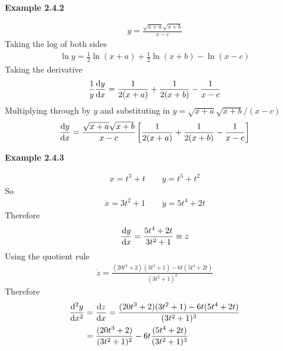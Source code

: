 \vspace{10mm}
\textbf{Example 2.4.2}

\begin{align*}
    y = \frac{\sqrt{x+a}\sqrt{x+b}}{x-c}
\end{align*}
Taking the log of both sides
\begin{align*}
    \ln y = \frac{1}{2} \ln(x+a) + \frac{1}{2} \ln(x+b) -  \ln(x-c)
\end{align*}
Taking the derivative
\begin{align*}
    \frac{1}{y}\frac{{\rm d}y}{{\rm d}x} = \frac{1}{2(x+a)} +\frac{1}{2(x+b)} -  \frac{1}{x-c}
\end{align*}
Multiplying through by $y$ and substituting in $y = \sqrt{x+a}\sqrt{x+b}/(x-c)$
\begin{align*}
    \frac{{\rm d}y}{{\rm d}x} = \frac{\sqrt{x+a}\sqrt{x+b}}{x-c}\left[\frac{1}{2(x+a)} +\frac{1}{2(x+b)} -  \frac{1}{x-c}\right]
\end{align*}

\vspace{10mm}
\textbf{Example 2.4.3}

\begin{align*}
x=t^3+t \qquad y=t^5+t^2
\end{align*}
So
\begin{align*}
\dot{x}=3t^2+1 \qquad \dot{y}=5t^4+2t
\end{align*}
Therefore
\begin{align*}
\frac{{\rm d}y}{{\rm d}x} = \frac{5t^4+2t}{3t^2+1} \equiv z
\end{align*}
Using the quotient rule
\begin{align*}
\dot{z} = \frac{(20t^3+2)(3t^2+1)-6t(5t^4+2t)}{(3t^2+1)^2}
\end{align*}
Therefore
\begin{align*}
\frac{{\rm d}^2y}{{\rm d}x^2} &= \frac{{\rm d}z}{{\rm d}x} = \frac{(20t^3+2)(3t^2+1)-6t(5t^4+2t)}{(3t^2+1)^3}\\
&= \frac{(20t^3+2)}{(3t^2+1)^2}-6t\frac{(5t^4+2t)}{(3t^2+1)^3}
\end{align*}